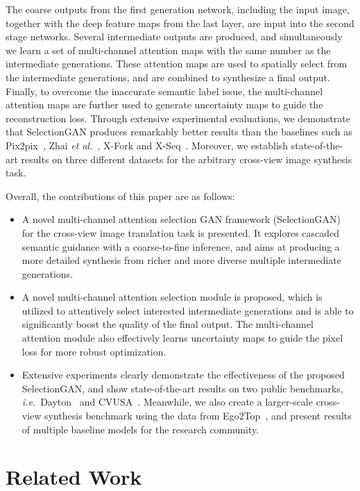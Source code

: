 \documentclass[10pt,twocolumn,letterpaper]{article}
\def\ie{\textit{i.e.}~}
\def\etal{\textit{et al.}~}
\begin{document}
The coarse outputs from the first generation network, including the input
image, together with the deep feature maps from the
last layer, are input into the second stage networks. Several
intermediate outputs are produced, and simultaneously we
learn a set of multi-channel attention maps with the same
number as the intermediate generations. These attention
maps are used to spatially select from the intermediate generations,
and are combined to synthesize a final output.
Finally, to overcome the inaccurate semantic label issue, the multi-channel attention maps are further used to generate uncertainty maps to guide the reconstruction loss. Through extensive experimental evaluations, we demonstrate that SelectionGAN produces remarkably better results than the baselines such as Pix2pix~\cite{isola2017image}, Zhai \etal \cite{zhai2017predicting}, X-Fork \cite{regmi2018cross} and X-Seq~\cite{regmi2018cross}. Moreover, we establish state-of-the-art results on three different datasets for the arbitrary cross-view image synthesis task. 

Overall, the contributions of this paper are as follows:
\begin{itemize}[leftmargin=*]
	\item A novel multi-channel attention selection GAN framework (SelectionGAN) for the cross-view image translation task is presented. It explores cascaded semantic guidance with a coarse-to-fine inference, and aims at producing a more detailed synthesis from richer and more diverse multiple intermediate generations.
	\item A novel multi-channel attention selection module is proposed, which is utilized to attentively select interested intermediate generations and is able to significantly boost the quality of the final output. The multi-channel attention module also effectively learns uncertainty maps to guide the pixel loss for more robust optimization.
	\item Extensive experiments clearly demonstrate the effectiveness of the proposed SelectionGAN, and show state-of-the-art results on two public benchmarks, \ie Dayton~\cite{vo2016localizing} and CVUSA~\cite{workman2015wide}. Meanwhile, we also create a larger-scale cross-view synthesis benchmark using the data from Ego2Top~\cite{ardeshir2016ego2top}, and present results of multiple baseline models for the research community.
\end{itemize}

\section{Related Work}
\vspace{-0.2cm}
\end{document}
